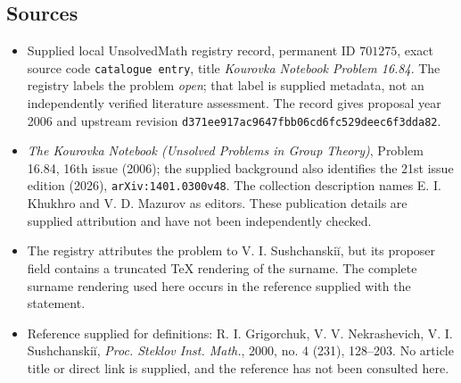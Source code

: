 \documentclass[11pt]{article}
\begin{document}
\subsection{Sources}
\begin{itemize}
\item Supplied local UnsolvedMath registry record, permanent ID \(701275\), exact source code \texttt{catalogue entry}, title \emph{Kourovka Notebook Problem 16.84}. The registry labels the problem \emph{open}; that label is supplied metadata, not an independently verified literature assessment. The record gives proposal year 2006 and upstream revision \texttt{d371ee917ac9647fbb06cd6fc529deec6f3dda82}.
\item \emph{The Kourovka Notebook (Unsolved Problems in Group Theory)}, Problem 16.84, 16th issue (2006); the supplied background also identifies the 21st issue edition (2026), \texttt{arXiv:1401.0300v48}. The collection description names E. I. Khukhro and V. D. Mazurov as editors. These publication details are supplied attribution and have not been independently checked.
\item The registry attributes the problem to V. I. Sushchanskiĭ, but its proposer field contains a truncated TeX rendering of the surname. The complete surname rendering used here occurs in the reference supplied with the statement.
\item Reference supplied for definitions: R. I. Grigorchuk, V. V. Nekrashevich, V. I. Sushchanskiĭ, \emph{Proc. Steklov Inst. Math.}, 2000, no. 4 (231), 128--203. No article title or direct link is supplied, and the reference has not been consulted here.
\end{itemize}
\end{document}
